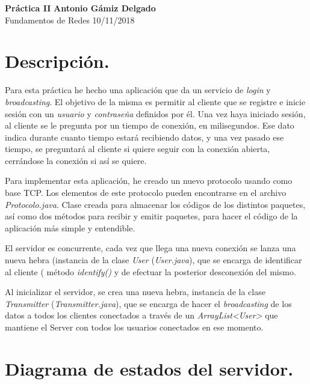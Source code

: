 \documentclass[a4paper, 11pt]{article}
\begin{document}
\noindent
\large\textbf{Práctica II} \hfill \textbf{Antonio Gámiz Delgado} \\
\normalsize Fundamentos de Redes \hfill 10/11/2018

\section{Descripción.}

Para esta práctica he hecho una aplicación que da un servicio de \textit{login} y \textit{broadcasting}. El objetivo de la misma es permitir al cliente que se registre e inicie sesión con un \textit{usuario} y \textit{contraseña} definidos por él. Una vez haya iniciado sesión, al cliente se le pregunta por un tiempo de conexión, en milisegundos. Ese dato indica durante cuanto tiempo estará recibiendo datos, y una vez pasado ese tiempo, se preguntará al cliente si quiere seguir con la conexión abierta, cerrándose la conexión si así se quiere.

Para implementar esta aplicación, he creado un nuevo protocolo usando como base TCP. Los elementos de este protocolo pueden encontrarse en el archivo \textit{Protocolo.java}. Clase creada para almacenar los códigos de los distintos paquetes, así como dos métodos para recibir y emitir paquetes, para hacer el código de la aplicación más simple y entendible. 

El servidor es concurrente, cada vez que llega una nueva conexión se lanza una nueva hebra (instancia de la clase \textit{User} (\textit{User.java}), que se encarga de identificar al cliente ( método \textit{identify()} y de efectuar la posterior desconexión del mismo. 

Al inicializar el servidor, se crea una nueva hebra, instancia de la clase \textit{Transmitter} (\textit{Transmitter.java}), que se encarga de hacer el \textit{broadcasting} de los datos a todos los clientes conectados a través de un \textit{ArrayList\textless User\textgreater} que mantiene el Server con todos los usuarios conectados en ese momento.
 
\section{Diagrama de estados del servidor.}
\end{document}
